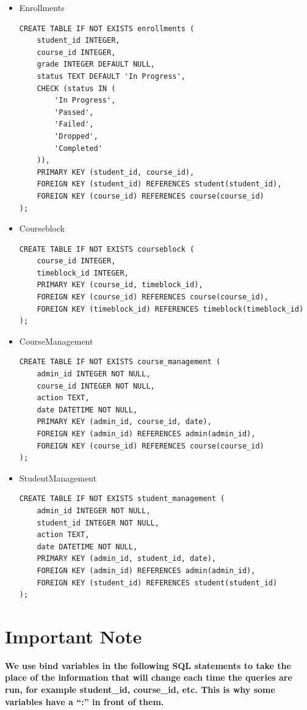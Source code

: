 \documentclass{report}
\newcommand{\usection}[1]{\section*{#1}
\addcontentsline{toc}{section}{\protect\numberline{}#1}}
\begin{document}
\begin{itemize}
    \item Enrollments
    \begin{lstlisting}
CREATE TABLE IF NOT EXISTS enrollments (
    student_id INTEGER,
    course_id INTEGER,
    grade INTEGER DEFAULT NULL,
    status TEXT DEFAULT 'In Progress',
    CHECK (status IN (
        'In Progress',
        'Passed',
        'Failed',
        'Dropped',
        'Completed'
    )),
    PRIMARY KEY (student_id, course_id),
    FOREIGN KEY (student_id) REFERENCES student(student_id),
    FOREIGN KEY (course_id) REFERENCES course(course_id)
);
    \end{lstlisting}

    \item Courseblock
    \begin{lstlisting}
CREATE TABLE IF NOT EXISTS courseblock (
    course_id INTEGER,
    timeblock_id INTEGER,
    PRIMARY KEY (course_id, timeblock_id),
    FOREIGN KEY (course_id) REFERENCES course(course_id),
    FOREIGN KEY (timeblock_id) REFERENCES timeblock(timeblock_id)
);
    \end{lstlisting}
    
    \pagebreak

    \item CourseManagement
    \begin{lstlisting}
CREATE TABLE IF NOT EXISTS course_management (
    admin_id INTEGER NOT NULL,
    course_id INTEGER NOT NULL,
    action TEXT,
    date DATETIME NOT NULL,
    PRIMARY KEY (admin_id, course_id, date),
    FOREIGN KEY (admin_id) REFERENCES admin(admin_id),
    FOREIGN KEY (course_id) REFERENCES course(course_id)
);
    \end{lstlisting}

    \item StudentManagement
    \begin{lstlisting}
CREATE TABLE IF NOT EXISTS student_management (
    admin_id INTEGER NOT NULL,
    student_id INTEGER NOT NULL,
    action TEXT,
    date DATETIME NOT NULL,
    PRIMARY KEY (admin_id, student_id, date),
    FOREIGN KEY (admin_id) REFERENCES admin(admin_id),
    FOREIGN KEY (student_id) REFERENCES student(student_id)
);
    \end{lstlisting}
    
\end{itemize}

\usection{Important Note}

\textbf{We use bind variables in the following SQL statements to take the place of the information that will change each time the queries are run, for example student\_id, course\_id, etc. This is why some variables have a ``:'' in front of them.}
\end{document}
